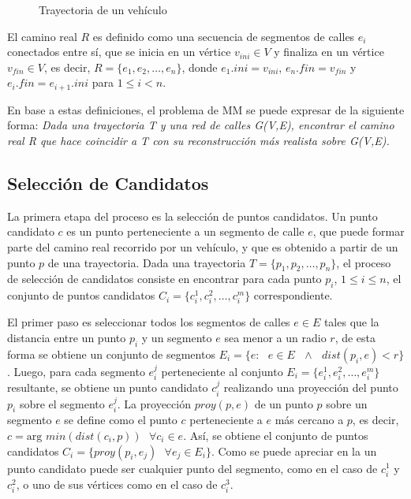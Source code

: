 \begin{figure}[h*]
	\centering
	
	\caption{\label{fig:trayectoria} Trayectoria de un vehículo}	
\end{figure}

El camino real $R$ es definido como una secuencia de segmentos de calles $e_i$ conectados entre sí, que se inicia en un vértice $v_{ini} \in V$ y finaliza en un vértice $v_{fin} \in V$, es decir, $R = \{ e_1, e_2, \dots, e_n \}$, donde $e_1.ini = v_{ini}$, $e_n.fin = v_{fin}$ y $e_i.fin = e_{i + 1}.ini$ para $1 \le i < n$.

En base a estas definiciones, el problema de MM se puede expresar de la siguiente forma: \emph{Dada una trayectoria T y una red de calles G(V,E), encontrar el camino real R que hace coincidir a T con su reconstrucción más realista sobre G(V,E).}

\subsection{Selección de Candidatos}
\label{seleccion_de_candidatos}

La primera etapa del proceso es la selección de puntos candidatos. Un punto candidato $c$ es un punto perteneciente a un segmento de calle $e$, que puede formar parte del camino real recorrido por un vehículo, y que es obtenido a partir de un punto $p$ de una trayectoria. Dada una trayectoria $T = \{p_1, p_2, \dots, p_n\}$, el proceso de selección de candidatos consiste en encontrar para cada punto $p_i$, $1\le i\le n$, el conjunto de puntos candidatos $C_i = \{c_{i}^{1}, c_{i}^{2}, \dots, c_{i}^{m}\}$ correspondiente.

El primer paso es seleccionar todos los segmentos de calles $e \in E$ tales que la distancia entre un punto $p_i$ y un segmento $e$ sea menor a un radio $r$, de esta forma se obtiene un conjunto de segmentos $E_i = \{ e : \text{ } e \in E \text{ } \wedge \text{ } dist(p_i, e) < r \}$. Luego, para cada segmento $e_{i}^{j}$ perteneciente al conjunto $E_i = \{e_{i}^{1}, e_{i}^{2}, \dots, e_{i}^{m}\}$ resultante, se obtiene un punto candidato $c_{i}^{j}$ realizando una proyección del punto $p_i$ sobre el segmento $e_{i}^{j}$. La proyección $proy(p, e)$ de un punto $p$ sobre un segmento $e$ se define como el punto $c$ perteneciente a $e$ más cercano a $p$, es decir, $c = \text{arg } min(dist(c_i, p)) \text{ } \forall c_i \in e$. Así, se obtiene el conjunto de puntos candidatos $C_i = \{ proy(p_i, e_j) \text{ } \forall e_j \in E_i \}$. Como se puede apreciar en la  un punto candidato puede ser cualquier punto del segmento, como en el caso de $c_{i}^{1}$ y $c_{i}^{2}$, o uno de sus vértices como en el caso de $c_{i}^{3}$.

